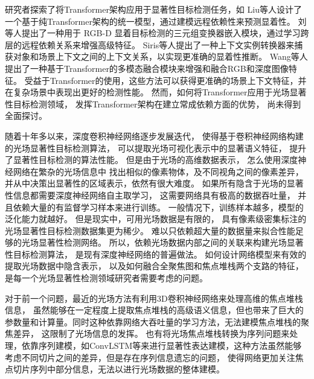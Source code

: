 研究者探索了将Transformer架构应用于显著性目标检测任务，如
Liu等人设计了一个基于纯Transformer架构的统一模型，通过建模远程依赖性来预测显着性。
刘等人提出了一种用于 RGB-D 显着目标检测的三元组变换器嵌入模块，通过学习跨层的远程依赖关系来增强高级特征。 
Siris等人提出了一种上下文实例转换器来捕获对象和场景上下文之间的上下文关系，以实现更准确的显着性推断。 
Wang等人提出了一种基于Transformer的多模态融合模块来增强和融合RGB和深度图像特征。
受益于Transformer的使用，这些方法可以获得更准确的场景上下文特征，并在复杂场景中表现出更好的检测性能。 然而，如何将Transformer应用于光场显著性目标检测领域，
发挥Transformer架构在建立常成依赖方面的优势，
尚未得到全面探讨。 











随着十年多以来，深度卷积神经网络逐步发展迭代，
使得基于卷积神经网络构建的光场显著性目标检测算法，
可以提取光场可视化表示中的显著语义特征，
提升了显著性目标检测的算法性能。
但是由于光场的高维数据表示，
怎么使用深度神经网络在繁杂的光场信息中
找出相似的像素物体，及不同视角之间的像素差异，
并从中决策出显著性的区域表示，依然有很大难度。
如果所有隐含于光场的显著性信息都需要深度神经网络自主取学习，
这需要网络具有极高的数据吞吐量，
并且依赖大量的有监督学习样本来进行训练。
一般情况下，训练样本越多，模型的泛化能力就越好。
但是现实中，可用光场数据是有限的，
具有像素级密集标注的光场显著性目标检测数据集更为稀少。
难以只依赖超大量的数据量来拟合性能足够的光场显著性检测网络。
所以，依赖光场数据内部之间的关联来构建光场显著性目标检测算法，
是现有深度神经网络的普遍做法。
如何设计网络模型来有效的提取光场数据中隐含表示，
以及如何融合全聚焦图和焦点堆栈两个支路的特征，
是每一个光场显著性检测领域研究者需要考虑的问题。






对于前一个问题，最近的光场方法有利用3D卷积神经网络来处理高维的焦点堆栈信息，
虽然能够在一定程度上提取焦点堆栈的高级语义信息，但也带来了巨大的参数量和计算量。同时这种依靠网络大吞吐量的学习方法，无法建模焦点堆栈的聚焦差异，
这限制了光场信息的发挥。
也有将光场焦点堆栈转换为序列问题来处理，依靠序列建模，如ConvLSTM等来进行显著性表达建模，这种方法虽然能够考虑不同切片之间的差异，但是存在序列信息遗忘的问题，
使得网络更加关注焦点切片序列中部分信息，无法以进行光场数据的整体建模。



